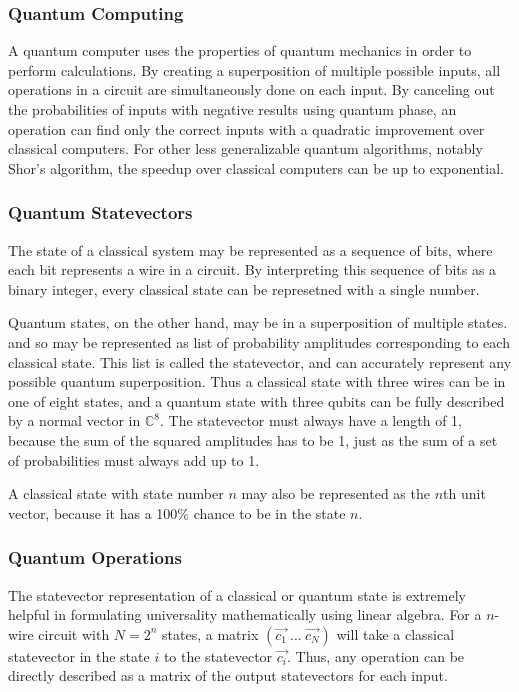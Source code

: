 \documentclass[12pt]{article}
\begin{document}
\subsubsection{Quantum Computing}
A quantum computer uses the properties of quantum mechanics in order to perform calculations. By creating a superposition of multiple possible inputs, all operations in a circuit are simultaneously done on each input. By canceling out the probabilities of inputs with negative results using quantum phase, an operation can find only the correct inputs with a quadratic improvement over classical computers. For other less generalizable quantum algorithms, notably Shor's algorithm, the speedup over classical computers can be up to exponential.

\subsubsection{Quantum Statevectors}
The state of a classical system may be represented as a sequence of bits, where each bit represents a wire in a circuit. By interpreting this sequence of bits as a binary integer, every classical state can be represetned with a single number.

Quantum states, on the other hand, may be in a superposition of multiple states. and so may be represented as list of probability amplitudes corresponding to each classical state. This list is called the statevector, and can accurately represent any possible quantum superposition. Thus a classical state with three wires can be in one of eight states, and a quantum state with three qubits can be fully described by a normal vector in $\mathbb{C}^8$. The statevector must always have a length of 1, because the sum of the squared amplitudes has to be 1, just as the sum of a set of probabilities must always add up to 1.

A classical state with state number $n$ may also be represented as the $n$th unit vector, because it has a 100$\%$ chance to be in the state $n$.

\subsubsection{Quantum Operations}
The statevector representation of a classical or quantum state is extremely helpful in formulating universality mathematically using linear algebra. For a $n$-wire circuit with $N=2^n$ states, a matrix
$(\vec{c_{1}} \: \dots \: \vec{c_{N}})$
will take a classical statevector in the state $i$ to the statevector $\vec{c_{i}}$. Thus, any operation can be directly described as a matrix of the output statevectors for each input.
\end{document}
